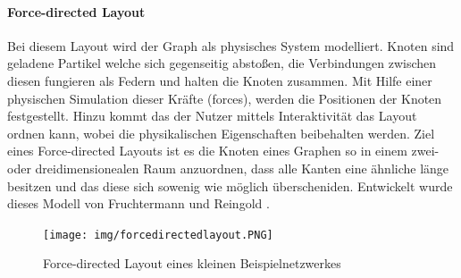 \documentclass[draft=false
              ,paper=a4
              ,twoside=false
              ,fontsize=11pt
              ,headsepline
              ,BCOR10mm
              ,DIV11
              ]{scrbook}
\newcommand{\TODO}[1]{\colorbox{yellow}{\textcolor{red}{[TODO: #1]}}}
\begin{document}
\paragraph{Force-directed Layout} %
\label{par:force_directed_layout}
Bei diesem Layout wird der Graph als physisches System modelliert. Knoten sind geladene Partikel welche sich gegenseitig abstoßen, die Verbindungen zwischen diesen fungieren als Federn und halten die Knoten zusammen. Mit Hilfe einer physischen Simulation dieser Kräfte (forces), werden die Positionen der Knoten festgestellt. Hinzu kommt das der Nutzer mittels Interaktivität das Layout ordnen kann, wobei die physikalischen Eigenschaften beibehalten werden. Ziel eines Force-directed Layouts ist es die Knoten eines Graphen so in einem zwei- oder dreidimensionealen Raum anzuordnen, dass alle Kanten eine ähnliche länge besitzen und das diese sich sowenig wie möglich überscheniden. Entwickelt wurde dieses Modell von Fruchtermann und Reingold \cite{Fruchterman91graphdrawing}. %
\begin{figure}[htbp]
  \centering
  \texttt{[image: img/forcedirectedlayout.PNG]}
  \caption{Force-directed Layout eines kleinen Beispielnetzwerkes}
  \label{fig:forcedirected}
\end{figure}
\end{document}
